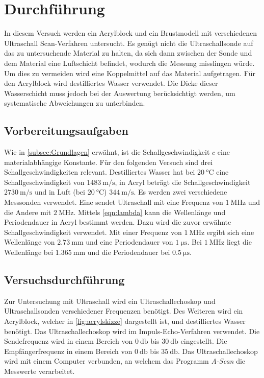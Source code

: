 \section{Durchführung}
\label{sec:Durchführung}
In diesem Versuch werden ein Acrylblock und ein Brustmodell mit verschiedenen Ultraschall Scan-Verfahren untersucht. Es genügt nicht die Ultraschallsonde auf das zu untersuchende Material zu halten, da sich dann
zwischen der Sonde und dem Material eine Luftschicht befindet, wodurch die Messung misslingen würde. Um dies zu vermeiden
wird eine Koppelmittel auf das Material aufgetragen. Für den Acrylblock wird destilliertes Wasser verwendet.
Die Dicke dieser Wasserschicht muss jedoch bei der Auswertung berücksichtigt werden, um systematische Abweichungen zu unterbinden.

\subsection{Vorbereitungsaufgaben}
\label{subsec:VBA}
Wie in \autoref{subsec:Grundlagen} erwähnt, ist die Schallgeschwindigkeit $c$ eine materialabhängige Konstante. Für den folgenden Versuch sind drei 
Schallgeschwindigkeiten relevant. Destilliertes Wasser hat bei $\qty{20}{\celsius}$ eine Schallgeschwindigkeit von $\qty{1483}{\metre\per\second}$,
in Acryl beträgt die Schallgeschwindigkeit $\qty{2730}{\metre\per\second}$ und in Luft (bei $\qty{20}{\celsius}$) $\qty{344}{\metre\per\second}$.
Es werden zwei verschiedene Messsonden verwendet. Eine sendet Ultraschall mit eine Frequenz von $\qty{1}{\mega\hertz}$ und die Andere mit $\qty{2}{\mega\hertz}$. 
Mittels \autoref{eqn:lambda} kann die Wellenlänge und Periodendauer in Acryl bestimmt werden. Dazu wird die zuvor erwähnte Schallgeschwindigkeit
verwendet. Mit einer Frequenz von $\qty{1}{\mega\hertz}$ ergibt sich eine Wellenlänge von $\qty{2.73}{\milli\metre}$ und eine Periodendauer von $\qty{1}{\micro\second}$. 
Bei $\qty{1}{\mega\hertz}$ liegt die Wellenlänge bei $\qty{1.365}{\milli\metre}$ und die Periodendauer bei $\qty{0.5}{\micro\second}$.
\subsection{Versuchsdurchführung}
\label{subsec:Versuchsdurchführung}
Zur Untersuchung mit Ultraschall wird ein Ultraschallechoskop und Ultraschallsonden verschiedener Frequenzen benötigt. Des Weiteren wird ein Acrylblock, welcher
in \autoref{fig:acrylskizze} dargestellt ist, und destilliertes Wasser benötigt. 
Das Ultraschallechoskop wird im Impuls-Echo-Verfahren verwendet. Die Sendefrequenz wird in einem Bereich von $\qty{0}{\decibel}$ bis $\qty{30}{\decibel}$ eingestellt. Die 
Empfängerfrequenz in einem Bereich von $\qty{0}{\decibel}$ bis $\qty{35}{\decibel}$. Das Ultraschallechoskop wird mit einem Computer verbunden, an welchem  
das Programm \textit{A-Scan} die Messwerte verarbeitet. 

